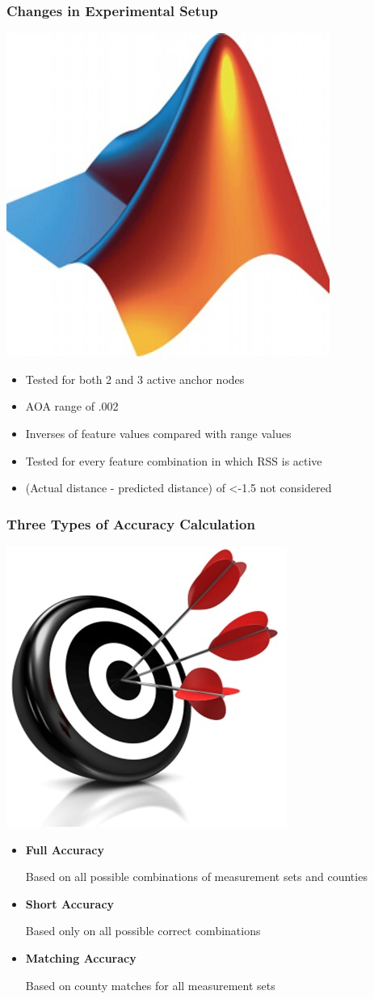 \documentclass{beamer}
\begin{document}
\begin{frame}
\frametitle{Changes in Experimental Setup}
\begin{center}
\includegraphics[width=.2\textwidth]{ml}
\end{center}
\begin{itemize}
\item{Tested for both 2 and 3 active anchor nodes}
\item{AOA range of .002}
\item{Inverses of feature values compared with range values}
\item{Tested for every feature combination in which RSS is active}
\item{(Actual distance - predicted distance) of <-1.5 not considered}
\end{itemize}
\end{frame}

\begin{frame}
\frametitle{Three Types of Accuracy Calculation}
\begin{center}
\includegraphics[width=.2\textwidth]{acc}
\end{center}
\begin{itemize}
\item{\textbf{Full Accuracy}

Based on all possible combinations of measurement sets and counties}
\item{\textbf{Short Accuracy}

Based only on all possible correct combinations}
\item{\textbf{Matching Accuracy}

Based on county matches for all measurement sets}
\end{itemize}
\end{frame}
\end{document}
